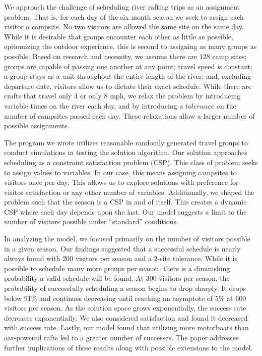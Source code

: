 \documentclass[11pt]{article} %
\begin{document}
We approach the challenge of scheduling river rafting trips as an
assignment problem. That is, for each day of the six month season we seek to
assign each visitor a campsite.
No two visitors are allowed the same site on
the same day.  While it is desirable that groups encounter each other
as little as possible, epitomizing the outdoor experience, this is second to
assigning as many groups as possible.
Based on research and necessity, we assume there are 128
camp sites; groups are capable of passing one another at any point;
travel speed is constant; a group stays
as a unit throughout the entire length of the river; and, excluding
departure date, visitors allow us to dictate their exact
schedule.  While there are crafts that travel only 4 or
only 8 mph, we relax the problem by introducing variable times on the river
each day,
and by introducing a $tolerance$ on the number of campsites passed each day.
These relaxations allow a larger number of possible assignments.

The program we wrote utilizes reasonable randomly generated travel
groups to conduct simulations in testing the solution algorithm.  Our
solution approaches scheduling as a constraint satisfaction problem (CSP).
This class of problem seeks to assign values to variables.  In our case,
this means assigning campsites to visitors once per day.
This allows us to explore solutions
with preference for visitor satisfaction or any other number of variables.
Additionally, we shaped the
problem such that the season is a CSP in and of itself.  This creates a dynamic
CSP where each day depends upon the last.  Our model suggests a limit to the
number of visitors possible under ``standard'' conditions.

In analyzing the model, we focused primarily on the number of visitors possible
in a given season.  Our findings suggested that a successful schedule is nearly
always found with 200 visitors per season and a 2-site tolerance.  While it is
possible to schedule many more groups per season, there is a diminishing
probability a valid schedule will be found.  At 300 visitors per season,
the probability of successfully scheduling a season begins to drop sharply.
It drops below 91\% and continues decreasing
until reaching an asymptote of 5\% at 600 visitors per
season. As the solution space grows exponentially, the success rate decreases
exponentially.  We also considered satisfaction and found it
decreased with success rate.  Lastly, our
model found that utilizing more motorboats than oar-powered rafts led to a
greater number of successes.  The paper addresses further implications of
these results along with possible extensions to the model.
\end{document}
